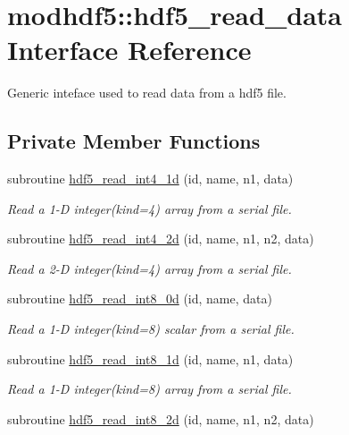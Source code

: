 \hypertarget{interfacemodhdf5_1_1hdf5__read__data}{\section{modhdf5\-:\-:hdf5\-\_\-read\-\_\-data Interface Reference}
\label{interfacemodhdf5_1_1hdf5__read__data}
}


Generic inteface used to read data from a hdf5 file.  


\subsection*{Private Member Functions}
\begin{DoxyCompactItemize}
\item 
subroutine \hyperlink{interfacemodhdf5_1_1hdf5__read__data_a484bfd3272dfc507ab6f7ee71bd60232}{hdf5\-\_\-read\-\_\-int4\-\_\-1d} (id, name, n1, data)
\begin{DoxyCompactList}\small\item\em Read a 1-\/\-D integer(kind=4) array from a serial file. \end{DoxyCompactList}\item 
subroutine \hyperlink{interfacemodhdf5_1_1hdf5__read__data_aebc8b06d547dd0b0a64e8d76bf9b933e}{hdf5\-\_\-read\-\_\-int4\-\_\-2d} (id, name, n1, n2, data)
\begin{DoxyCompactList}\small\item\em Read a 2-\/\-D integer(kind=4) array from a serial file. \end{DoxyCompactList}\item 
subroutine \hyperlink{interfacemodhdf5_1_1hdf5__read__data_a4b43a721044be9ae8155dcff0dc54753}{hdf5\-\_\-read\-\_\-int8\-\_\-0d} (id, name, data)
\begin{DoxyCompactList}\small\item\em Read a 1-\/\-D integer(kind=8) scalar from a serial file. \end{DoxyCompactList}\item 
subroutine \hyperlink{interfacemodhdf5_1_1hdf5__read__data_ae4d30f084b576d04638ddc6c8d35a490}{hdf5\-\_\-read\-\_\-int8\-\_\-1d} (id, name, n1, data)
\begin{DoxyCompactList}\small\item\em Read a 1-\/\-D integer(kind=8) array from a serial file. \end{DoxyCompactList}\item 
subroutine \hyperlink{interfacemodhdf5_1_1hdf5__read__data_aac8b36f082332a365fc9f89d1f7df37a}{hdf5\-\_\-read\-\_\-int8\-\_\-2d} (id, name, n1, n2, data)

\end{DoxyCompactItemize}
